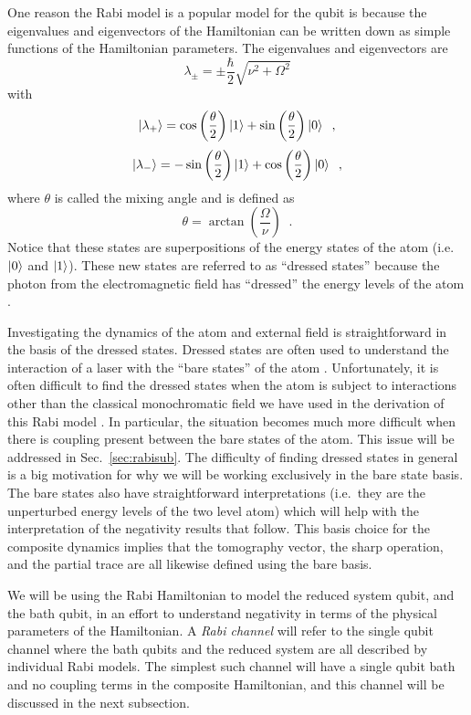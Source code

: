 One reason the Rabi model is a popular model for the qubit is because the eigenvalues and eigenvectors of the Hamiltonian can be written down as simple functions of the Hamiltonian parameters.  The eigenvalues and eigenvectors are \cite{Kok2010}
$$
\lambda_{\pm} = \pm \frac{\hbar}{2}\sqrt{\nu^2+\Omega^2}
$$
with
$$
\left|\lambda_+\right\rangle = \cos{\left(\frac{\theta}{2}\right)}\left|1\right\rangle+\sin{\left(\frac{\theta}{2}\right)}\left|0\right\rangle\;\;,
$$
$$
\left|\lambda_-\right\rangle = -\sin{\left(\frac{\theta}{2}\right)}\left|1\right\rangle+\cos{\left(\frac{\theta}{2}\right)}\left|0\right\rangle\;\;,
$$
where $\theta$ is called the mixing angle and is defined as
$$
\theta = \arctan{\left(\frac{\Omega}{\nu}\right)}\;\;.
$$
Notice that these states are superpositions of the energy states of the atom (i.e.\ $\left|0\right\rangle$ and $\left|1\right\rangle$).  These new states are referred to as ``dressed states'' because the photon from the electromagnetic field has ``dressed'' the energy levels of the atom \cite{Suter1997}.  

Investigating the dynamics of the atom and external field is straightforward in the basis of the dressed states.  Dressed states are often used to understand the interaction of a laser with the ``bare states'' of the atom \cite{Barnett2002}.  Unfortunately, it is often difficult to find the dressed states when the atom is subject to interactions other than the classical monochromatic field we have used in the derivation of this Rabi model \cite{Barnett2002}.  In particular, the situation becomes much more difficult when there is coupling present between the bare states of the atom.  This issue will be addressed in Sec.\ \ref{sec:rabisub}.  The difficulty of finding dressed states in general is a big motivation for why we will be working exclusively in the bare state basis.  The bare states also have straightforward interpretations (i.e.\ they are the unperturbed energy levels of the two level atom) which will help with the interpretation of the negativity results that follow.  This basis choice for the composite dynamics implies that the tomography vector, the sharp operation, and the partial trace are all likewise defined using the bare basis.

We will be using the Rabi Hamiltonian to model the reduced system qubit, and the bath qubit, in an effort to understand negativity in terms of the physical parameters of the Hamiltonian.  A {\em Rabi channel} will refer to the single qubit channel where the bath qubits and the reduced system are all described by individual Rabi models.  The simplest such channel will have a single qubit bath and no coupling terms in the composite Hamiltonian, and this channel will be discussed in the next subsection.

